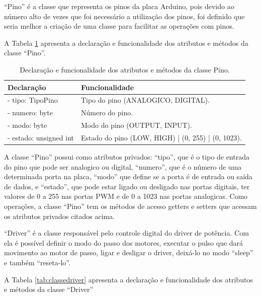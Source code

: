 “Pino” é a classe que representa os pinos da placa Arduino, pois devido ao número alto de vezes que foi 
necessário a utilização dos pinos, foi definido que seria melhor a criação de uma classe para facilitar 
as operações com pinos. 

A Tabela \ref{tab:classepino} apresenta a declaração e funcionalidade dos atributos e métodos da 
classe “Pino”.

\begin{table}[H]
    \footnotesize
    \centering
    \caption{Declaração e funcionalidade dos atributos e métodos da classe Pino.}
    \begin{tabular}{lp{9cm}}
        \hline
        \textbf{Declaração} & \textbf{Funcionalidade}\\
        \hline
        - tipo: TipoPino & Tipo do pino (ANALOGICO, DIGITAL).\\
        - numero: byte & Número do pino.\\
        - modo: byte & Modo do pino (OUTPUT, INPUT).\\
        - estado: unsigned int & Estado do pino (LOW, HIGH) | (0, 255) | (0, 1023).\\
        \hline       
    \end{tabular}
    \label{tab:classepino}
\end{table}

A classe “Pino” possui como atributos privados: “tipo”, que é o tipo de entrada do pino que pode ser 
analogico ou digital, “numero”, que é o número de uma determinada porta na placa, “modo” que define se 
a porta é de entrada ou saída de dados, e “estado”, que pode estar ligado ou desligado nas portas digitais, 
ter valores de 0 a 255 nas portas \ac{PWM} e de 0 a 1023 nas portas analogicas. Como operações, a classe “Pino” 
tem os métodos de acesso getters e setters que acessam os atributos privados citados acima.

“Driver” é a classe responsável pelo controle digital do driver de potência. Com ela é possível definir 
o modo do passo dos motores, executar o pulso que dará movimento ao motor de passo, ligar e desligar 
o driver, deixá-lo no modo “sleep” e também “reseta-lo”.

A Tabela \ref{tab:classedriver} apresenta a declaração e funcionalidade dos atributos e métodos da 
classe “Driver”


